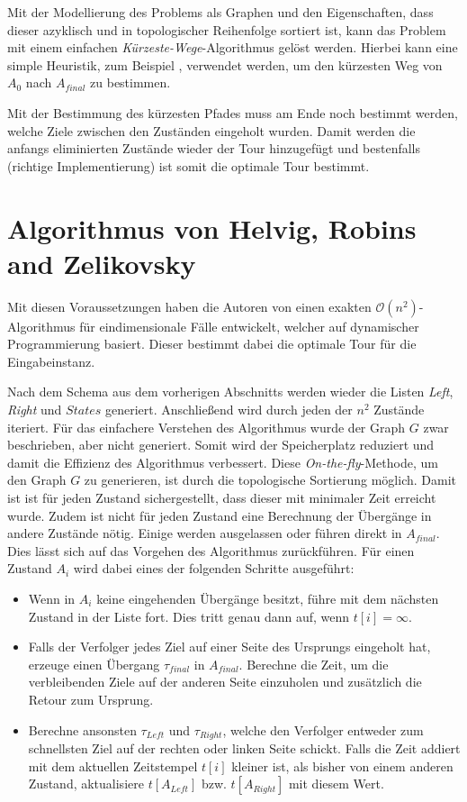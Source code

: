 \documentclass[german,version-2019-11]{uzl-thesis}
\begin{document}
Mit der Modellierung des Problems als Graphen und den Eigenschaften, dass dieser azyklisch und in topologischer Reihenfolge sortiert ist, kann das Problem mit einem einfachen \emph{Kürzeste-Wege}-Algorithmus gelöst werden. Hierbei kann eine simple Heuristik, zum Beispiel \cite{brandstadt1994kurzeste}, verwendet werden, um den kürzesten Weg von $A_0$ nach $A_{final}$ zu bestimmen.

Mit der Bestimmung des kürzesten Pfades muss am Ende noch bestimmt werden, welche Ziele zwischen den Zuständen eingeholt wurden. Damit werden die anfangs eliminierten Zustände wieder der Tour hinzugefügt und bestenfalls (richtige Implementierung) ist somit die optimale Tour bestimmt.

\section{Algorithmus von Helvig, Robins and Zelikovsky}

Mit diesen Voraussetzungen haben die Autoren von \cite{helvig} einen exakten $\mathcal{O}(n^2)$-Algorithmus für eindimensionale Fälle entwickelt, welcher auf dynamischer Programmierung basiert. Dieser bestimmt dabei die optimale Tour für die Eingabeinstanz. 

Nach dem Schema aus dem vorherigen Abschnitts werden wieder die Listen \emph{Left}, \emph{Right} und $States$ generiert. Anschließend wird durch jeden der $n^2$ Zustände iteriert. Für das einfachere Verstehen des Algorithmus wurde der Graph $G$ zwar beschrieben, aber nicht generiert. Somit wird der Speicherplatz reduziert und damit die Effizienz des Algorithmus verbessert. Diese \emph{On-the-fly}-Methode, um den Graph $G$ zu generieren, ist durch die topologische Sortierung möglich. Damit ist ist für jeden Zustand sichergestellt, dass dieser mit minimaler Zeit erreicht wurde. Zudem ist nicht für jeden Zustand eine Berechnung der Übergänge in andere Zustände nötig. Einige werden ausgelassen oder führen direkt in $A_{final}$. Dies lässt sich auf das Vorgehen des Algorithmus zurückführen. Für einen Zustand $A_i$ wird dabei eines der folgenden Schritte ausgeführt:
\begin{itemize}
\item Wenn in $A_i$ keine eingehenden Übergänge besitzt, führe mit dem nächsten Zustand in der Liste fort. Dies tritt genau dann auf, wenn $t[i] = \infty$.
\item Falls der Verfolger jedes Ziel auf einer Seite des Ursprungs eingeholt hat, erzeuge einen Übergang $\tau_{final}$ in $A_{final}$. Berechne die Zeit, um die verbleibenden Ziele auf der anderen Seite einzuholen und zusätzlich die Retour zum Ursprung. 
\item Berechne ansonsten $\tau_{Left}$ und $\tau_{Right}$, welche den Verfolger entweder zum schnellsten Ziel auf der rechten oder linken Seite schickt. Falls die Zeit addiert mit dem aktuellen Zeitstempel $t[i]$ kleiner ist, als bisher von einem anderen Zustand, aktualisiere $t[A_{Left}]$ bzw. $t[A_{Right}]$ mit diesem Wert.
\end{itemize}
\end{document}
